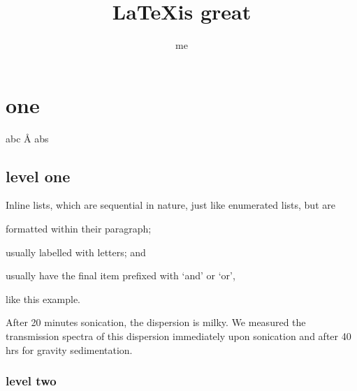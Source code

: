 \documentclass[12pt,oneside]{book}
\begin{document}
  \title{\LaTeX is great}
  \author{me}
  \maketitle

    \clearpage
    \tableofcontents
    \clearpage
    \listoftables
    \clearpage
    \listoffigures

    \begin{singlespace}
    \renewcommand{\glossarypreamble}{\thispagestyle{myheadings}} %
    \printglossary[type=\acronymtype]
    \clearpage
    \end{singlespace}

\chapter{one}
abc \si{\angstrom} abs

\section{level one}
Inline lists, which are sequential in nature, just like enumerated lists, but are
\begin{enumerate*}[label=\itshape\alph*\upshape)]
\item formatted within their paragraph;
\item usually labelled with letters; and
\item usually have the final item prefixed with `and' or `or',
\end{enumerate*} like this example.

\begin{hypothesis}
After 20 minutes sonication, the dispersion is milky. We measured the transmission spectra of this dispersion immediately upon sonication and after 40 hrs for gravity sedimentation.
\end{hypothesis}
\subsection{level two }
\end{document}
